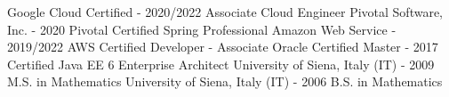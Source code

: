\begin{cventries}
    \cventry
    {Google Cloud Certified - 2020/2022}
    {Associate Cloud Engineer}
    {}
    {}
    {}
    \cventry
    {Pivotal Software, Inc. - 2020}
    {Pivotal Certified Spring Professional}
    {}
    {}
    {}
    \cventry
    {Amazon Web Service - 2019/2022}
    {AWS Certified Developer - Associate}
    {}
    {}
    {}
    \cventry
    {Oracle Certified Master - 2017}
    {Certified Java EE 6 Enterprise Architect}
    {}
    {}
    {}
  \cventry
    {University of Siena, Italy (IT) - 2009}
    {M.S. in Mathematics}
    {}
    {}
    {}
  \cventry
    {University of Siena, Italy (IT) - 2006}
    {B.S. in Mathematics}
    {}
    {}
    {}
\end{cventries}